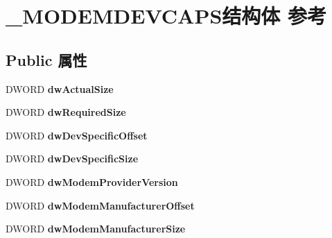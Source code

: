 \hypertarget{struct___m_o_d_e_m_d_e_v_c_a_p_s}{}\section{\+\_\+\+M\+O\+D\+E\+M\+D\+E\+V\+C\+A\+P\+S结构体 参考}
\label{struct___m_o_d_e_m_d_e_v_c_a_p_s}
\subsection*{Public 属性}
\begin{DoxyCompactItemize}
\item 
\mbox{\label{struct___m_o_d_e_m_d_e_v_c_a_p_s_a8249f1c3ca023ba0e2621e9971dd53fc}} 
D\+W\+O\+RD {\bfseries dw\+Actual\+Size}
\item 
\mbox{\label{struct___m_o_d_e_m_d_e_v_c_a_p_s_a7b36b9866343c6409d4119b11e9c7169}} 
D\+W\+O\+RD {\bfseries dw\+Required\+Size}
\item 
\mbox{\label{struct___m_o_d_e_m_d_e_v_c_a_p_s_a8ca85a08a26793866ce6c29c6e637f3c}} 
D\+W\+O\+RD {\bfseries dw\+Dev\+Specific\+Offset}
\item 
\mbox{\label{struct___m_o_d_e_m_d_e_v_c_a_p_s_a425fab4a1456c887fe231d3d9f3771e6}} 
D\+W\+O\+RD {\bfseries dw\+Dev\+Specific\+Size}
\item 
\mbox{\label{struct___m_o_d_e_m_d_e_v_c_a_p_s_abac264e80fd25a2752610b7a862e25a0}} 
D\+W\+O\+RD {\bfseries dw\+Modem\+Provider\+Version}
\item 
\mbox{\label{struct___m_o_d_e_m_d_e_v_c_a_p_s_a5e3ab467831393cae6ada8c5b19c2156}} 
D\+W\+O\+RD {\bfseries dw\+Modem\+Manufacturer\+Offset}
\item 
\mbox{\label{struct___m_o_d_e_m_d_e_v_c_a_p_s_a0984c81198f49f865bd07ac64ce4d1a3}} 
D\+W\+O\+RD {\bfseries dw\+Modem\+Manufacturer\+Size}
\item 
\mbox{\label{struct___m_o_d_e_m_d_e_v_c_a_p_s_a73ac55fa9953094c3394909235de63f4}} 

\end{DoxyCompactItemize}
